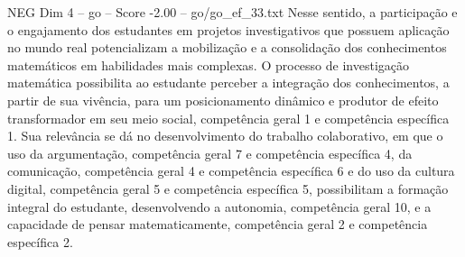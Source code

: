 \begin{textsample}{NEG Dim 4 – go – Score -2.00 – go/go\_ef\_33.txt}
Nesse sentido, a participação e o engajamento dos estudantes em projetos investigativos que possuem aplicação no mundo real potencializam a mobilização e a consolidação dos conhecimentos matemáticos em habilidades mais complexas.
O processo de investigação matemática possibilita ao estudante perceber a integração dos conhecimentos, a partir de sua vivência, para um posicionamento dinâmico e produtor de efeito transformador em seu meio social, competência geral 1 e competência específica 1.
Sua relevância se dá no desenvolvimento do trabalho colaborativo, em que o uso da argumentação, competência geral 7 e competência específica 4, da comunicação, competência geral 4 e competência específica 6 e do uso da cultura digital, competência geral 5 e competência específica 5, possibilitam a formação integral do estudante, desenvolvendo a autonomia, competência geral 10, e a capacidade de pensar matematicamente, competência geral 2 e competência específica 2.

\end{textsample}
